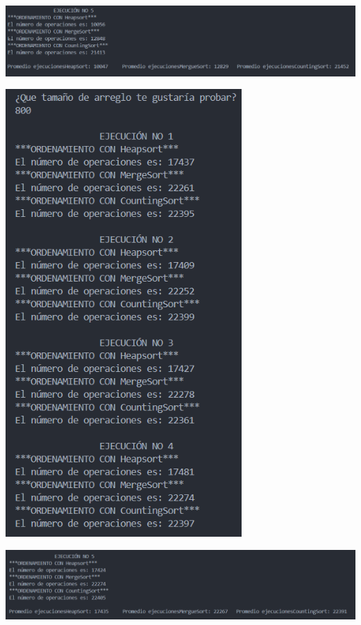 \documentclass[12pt]{article}
\begin{document}
\par\vspace{0.4cm}
\includegraphics[width=16cm]{Images/Tam.500/2.png}
\par\vspace{0.4cm}
\includegraphics[width=9cm]{Images/Tam.800/1.png}
\par\vspace{0.4cm}
\includegraphics[width=16cm]{Images/Tam.800/2.png}
\par\vspace{0.4cm}
\end{document}

